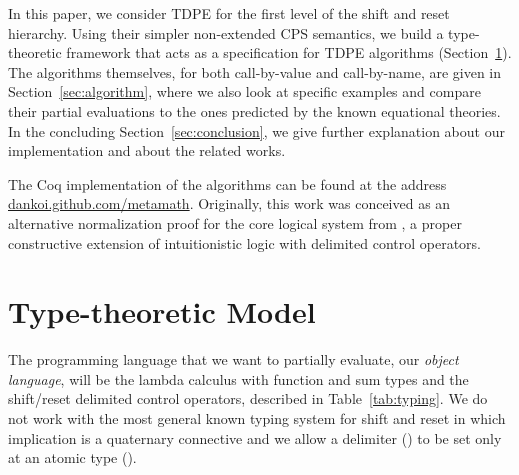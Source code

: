 \documentclass{eptcs}
\theoremstyle{definition}
\theoremstyle{plain}
\theoremstyle{remark}
\begin{document}
In this paper, we consider TDPE for the first level of the shift and reset hierarchy. Using their simpler non-extended CPS semantics, we build a type-theoretic framework that acts as a specification for TDPE algorithms (Section~\ref{sec:model}). The algorithms themselves, for both call-by-value and call-by-name, are given in Section~\ref{sec:algorithm}, where we also look at specific examples and compare their partial evaluations to the ones predicted by the known equational theories. In the concluding Section~\ref{sec:conclusion}, we give further explanation about our implementation and about the related works.

The Coq implementation of the algorithms can be found at the address \href{http://dankoi.github.com/metamath/}{dankoi.github.com/metamath}. Originally, this work was conceived as an alternative normalization proof for the core logical system from \cite{Ilik2010}, a proper constructive extension of intuitionistic logic with delimited control operators.

\section{Type-theoretic Model}\label{sec:model}

The programming language that we want to partially evaluate, our \emph{object language}, will be the lambda calculus with function and sum types and the shift/reset delimited control operators, described in Table~\ref{tab:typing}. We do not work with the most general known typing system for shift and reset in which implication is a quaternary connective \cite{DanvyF1989} and we allow a delimiter () to be set only at an atomic type ().
\end{document}
